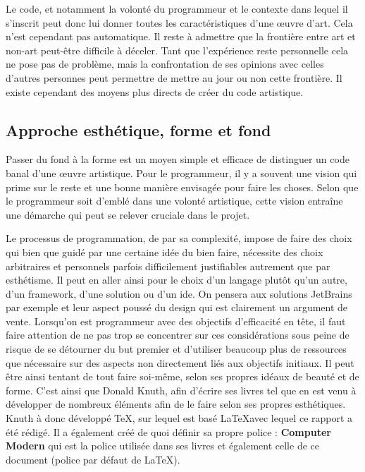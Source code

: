 \documentclass[12pt]{article} %
\begin{document}
Le code, et notamment la volonté du programmeur et le contexte dans lequel il s'inscrit peut donc lui donner toutes les caractéristiques d'une œuvre d'art. Cela n'est cependant pas automatique. Il reste à admettre que la frontière entre art et non-art peut-être difficile à déceler. Tant que l'expérience reste personnelle cela ne pose pas de problème, mais la confrontation de ses opinions avec celles d'autres personnes peut permettre de mettre au jour ou non cette frontière. Il existe cependant des moyens plus directs de créer du code artistique.

\subsection{Approche esthétique, forme et fond} %
Passer du fond à la forme est un moyen simple et efficace de distinguer un code banal d'une œuvre artistique. Pour le programmeur, il y a souvent une vision qui prime sur le reste et une bonne manière envisagée pour faire les choses. Selon que le programmeur soit d'emblé dans une volonté artistique, cette vision entraîne une démarche qui peut se relever cruciale dans le projet.

Le processus de programmation, de par sa complexité, impose de faire des choix qui bien que guidé par une certaine idée du bien faire, nécessite des choix arbitraires et personnels parfois difficilement justifiables autrement que par esthétisme. Il peut en aller ainsi pour le choix d'un langage plutôt qu'un autre, d'un framework, d'une solution ou d'un \acrshort{ide}. On pensera aux solutions JetBrains par exemple et leur aspect poussé du design qui est clairement un argument de vente. Lorsqu'on est programmeur avec des objectifs d'efficacité en tête, il faut faire attention de ne pas trop se concentrer sur ces considérations sous peine de risque de se détourner du but premier et d'utiliser beaucoup plus de ressources que nécessaire sur des aspects non directement liés aux objectifs initiaux. Il peut être ainsi tentant de tout faire soi-même, selon ses propres idéaux de beauté et de forme. C'est ainsi que Donald Knuth, afin d'écrire ses livres tel que  \cite{DKnuth1997} en est venu à développer de nombreux éléments afin de le faire selon ses propres esthétiques. Knuth à donc développé TeX, sur lequel est basé \LaTeX avec lequel ce rapport a été rédigé. Il a également créé de quoi définir sa propre police : \textbf{Computer Modern} qui est la police utilisée dans ses livres et également celle de ce document (police par défaut de \LaTeX). 
\end{document}

